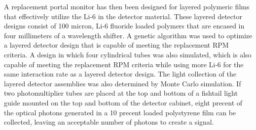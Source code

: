 A replacement portal monitor has then been designed for layered polymeric films that effectively utilize the Li-6 in the detector material.
These layered detector designs consist of 100 micron, Li-6 fluoride loaded polymers that are encased in four millimeters of a wavelength shifter.
A genetic algorithm was used to optimize a layered detector design that is capable of meeting the replacement RPM criteria.
A design in which four cylindrical tubes was also simulated, which is also capable of meeting the replacement RPM criteria while using more Li-6 for the same interaction rate as a layered detector design.
The light collection of the layered detector assemblies was also determined by Monte Carlo simulation.
If two photomultiplier tubes are placed at the top and bottom of a fishtail light guide mounted on the top and bottom of the detector cabinet, eight precent of the optical photons generated in a 10 precent loaded polystyrene film can be collected, leaving an acceptable number of photons to create a signal.
